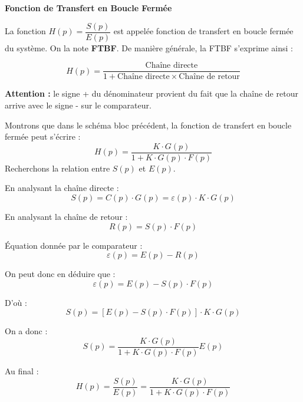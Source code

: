 \documentclass[10pt,fleqn]{article} %
\begin{document}
\begin{resultat}
\textbf{Fonction de Transfert en Boucle Fermée}

La fonction $H(p)=\dfrac{S(p)}{E(p)} $ est appelée fonction de transfert en boucle fermée du
système. On la note \textbf{FTBF}. De manière générale, la FTBF s'exprime ainsi : 

$$
H(p)= \dfrac{\text{Chaîne directe}}{
1+\text{Chaîne directe}\times\text{Chaîne de retour}}
$$

\textbf{Attention :} le signe + du dénominateur  provient du fait que la chaîne de retour arrive avec le signe - sur le comparateur.

\end{resultat}

\ifprof

Montrons que dans le schéma bloc précédent, la fonction de transfert en boucle fermée peut s'écrire : 
$$
H(p)=\dfrac{K\cdot G(p)}{1+K\cdot G(p) \cdot F(p)}
$$
Recherchons la relation entre $S(p)$ et $E(p)$.

En analysant la chaîne directe :
$$ S(p)= C(p) \cdot G(p) = \varepsilon(p) \cdot K \cdot G(p)$$

En analysant la chaîne de retour : 
$$ R(p)= S(p) \cdot F(p) $$

Équation donnée par le comparateur : 
$$\varepsilon(p) = E(p) - R(p)$$
\else
{}
\fi

%


\ifprof
On peut donc en déduire que :
$$\varepsilon(p) = E(p) - S(p) \cdot F(p) $$

D'où :
$$ 
S(p)= \left[ E(p) - S(p) \cdot F(p) \right] \cdot K \cdot G(p) 
$$

On a donc :
$$ 
S(p)= \dfrac{K \cdot G(p)}{1+K \cdot G(p) \cdot F(p)} E(p)
$$

Au final : 
$$ 
H(p)=\dfrac{S(p)}{E(p)}= \dfrac{K \cdot G(p)}{1+K \cdot G(p) \cdot F(p)}
$$
\else
{}
\fi
\end{document}
